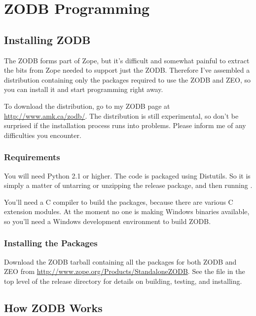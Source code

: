 
   

\section{ZODB Programming}

\subsection{Installing ZODB}

The ZODB forms part of Zope, but it's difficult and somewhat painful
to extract the bits from Zope needed to support just the ZODB.
Therefore I've assembled a distribution containing only the packages
required to use the ZODB and ZEO, so you can install it and start
programming right away.

To download the distribution, go to my ZODB page at 
\url{http://www.amk.ca/zodb/}.  
The distribution is still experimental, so don't be surprised if the
installation process runs into problems.  Please inform me of any
difficulties you encounter.

\subsubsection{Requirements}

You will need Python 2.1 or higher.  The code is packaged using
Distutils.  So it is simply a matter of untarring or unzipping the
release package, and then running .

You'll need a C compiler to build the packages, because there are
various C extension modules.  At the moment no one is making Windows
binaries available, so you'll need a Windows development environment
to build ZODB.

\subsubsection{Installing the Packages}

Download the ZODB tarball containing all the packages for both ZODB
and ZEO from \url{http://www.zope.org/Products/StandaloneZODB}.  See
the  file in the top level of the release directory
for details on building, testing, and installing.

\subsection{How ZODB Works}

